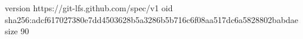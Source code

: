 version https://git-lfs.github.com/spec/v1
oid sha256:adcf617027380e7dd4503628b5a3286b5b716c6f08aa517dc6a5828802babdae
size 90
